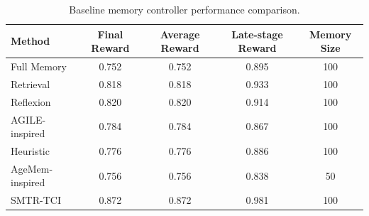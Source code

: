 \begin{table}[t]
\caption{Baseline memory controller performance comparison.}
\label{tab:baseline_performance}
\centering
\begin{tabular}{l c c c c}
\toprule
Method & Final Reward & Average Reward & Late-stage Reward & Memory Size \\
\midrule
Full Memory & 0.752 & 0.752 & 0.895 & 100 \\
Retrieval & 0.818 & 0.818 & 0.933 & 100 \\
Reflexion & 0.820 & 0.820 & 0.914 & 100 \\
AGILE-inspired & 0.784 & 0.784 & 0.867 & 100 \\
Heuristic & 0.776 & 0.776 & 0.886 & 100 \\
AgeMem-inspired & 0.756 & 0.756 & 0.838 & 50 \\
SMTR-TCI & 0.872 & 0.872 & 0.981 & 100 \\
\bottomrule
\end{tabular}
\end{table}
